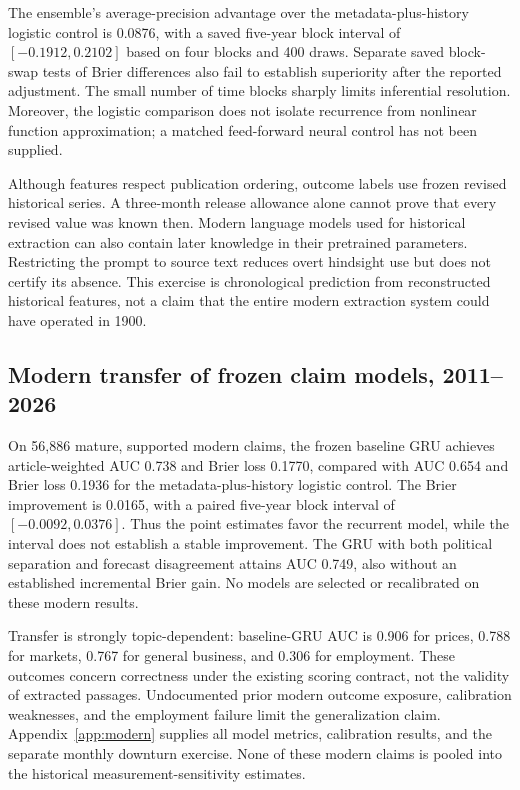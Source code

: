 The ensemble's average-precision advantage over the metadata-plus-history logistic control is 0.0876, with a saved five-year block interval of $[-0.1912,0.2102]$ based on four blocks and 400 draws. Separate saved block-swap tests of Brier differences also fail to establish superiority after the reported adjustment. The small number of time blocks sharply limits inferential resolution. Moreover, the logistic comparison does not isolate recurrence from nonlinear function approximation; a matched feed-forward neural control has not been supplied.

Although features respect publication ordering, outcome labels use frozen revised historical series. A three-month release allowance alone cannot prove that every revised value was known then. Modern language models used for historical extraction can also contain later knowledge in their pretrained parameters. Restricting the prompt to source text reduces overt hindsight use but does not certify its absence. This exercise is chronological prediction from reconstructed historical features, not a claim that the entire modern extraction system could have operated in 1900.

\subsection{Modern transfer of frozen claim models, 2011--2026}
On 56,886 mature, supported modern claims, the frozen baseline GRU achieves article-weighted AUC 0.738 and Brier loss 0.1770, compared with AUC 0.654 and Brier loss 0.1936 for the metadata-plus-history logistic control. The Brier improvement is 0.0165, with a paired five-year block interval of $[-0.0092,0.0376]$. Thus the point estimates favor the recurrent model, while the interval does not establish a stable improvement. The GRU with both political separation and forecast disagreement attains AUC 0.749, also without an established incremental Brier gain. No models are selected or recalibrated on these modern results.

Transfer is strongly topic-dependent: baseline-GRU AUC is 0.906 for prices, 0.788 for markets, 0.767 for general business, and 0.306 for employment. These outcomes concern correctness under the existing scoring contract, not the validity of extracted passages. Undocumented prior modern outcome exposure, calibration weaknesses, and the employment failure limit the generalization claim. Appendix~\ref{app:modern} supplies all model metrics, calibration results, and the separate monthly downturn exercise. None of these modern claims is pooled into the historical measurement-sensitivity estimates.

